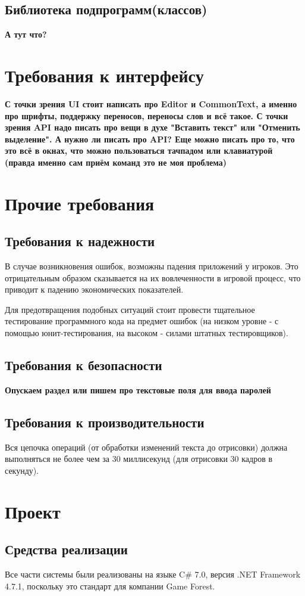 \documentclass{fefu}
\begin{document}
		\subsection{Библиотека подпрограмм(классов)}
			\textbf{А тут что?}
	\section{Требования к интерфейсу}
		\textbf{С точки зрения UI стоит написать про Editor и CommonText, а именно про 
		шрифты, поддержку переносов, переносы слов и всё такое. С точки зрения API надо писать
		про вещи в духе "Вставить текст" или "Отменить выделение". А нужно ли писать про API?
		Еще можно писать про то, что это всё в окнах, что можно пользоваться тачпадом или 
		клавиатурой (правда именно сам приём команд это не моя проблема)}
	\section{Прочие требования}
		\subsection{Требования к надежности}
			\par В случае возникновения ошибок, возможны падения приложений у игроков. Это 
			отрицательным образом сказывается на их вовлеченности в игровой процесс, что
			приводит к падению экономических показателей.
			\par Для предотвращения подобных ситуаций стоит провести тщательное тестирование
			программного кода на предмет ошибок (на низком уровне - с помощью 
			юнит-тестирования, на высоком - силами штатных тестировщиков).
		\subsection{Требования к безопасности}
			\textbf{Опускаем раздел или пишем про текстовые поля для ввода паролей}
		\subsection{Требования к производительности}
			Вся цепочка операций (от обработки изменений текста до 
			отрисовки) должна выполняться не более чем за 30 миллисекунд (для отрисовки 30 
			кадров в секунду).
	\section{Проект}
		\subsection{Средства реализации}
			Все части системы были реализованы на языке C\# 7.0, 
			версия .NET Framework 4.7.1, поскольку это стандарт для компании Game Forest.
\end{document}
